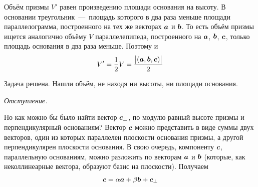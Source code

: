 \documentclass[a4paper,12pt]{article}
\begin{document}
  \begin{solution}
    Объём призмы $V'$ равен произведению площади основания на высоту.
    В основании треугольник~---~площадь которого в два раза меньше площади параллелограмма, построенного на тех же векторах $\boldsymbol a$ и $\boldsymbol b$.
    То есть объём призмы ищется аналогично объёму $V$ параллелепипеда, построенного на $\boldsymbol a$, $\boldsymbol b$, $\boldsymbol c$, только площадь основания в два раза меньше.
    Поэтому и
    \[
      V' = \frac{1}{2} V = \frac{\bigl|(\boldsymbol a, \boldsymbol b, \boldsymbol c)\bigr|}{2}
    \]
    
    Задача решена.
    Нашли объём, не находя ни высоты, ни площади основания.
    
    \bigskip
    
    \emph{Отступление.}
    
    Но как можно бы было найти вектор $\boldsymbol c_{\perp}$, по модулю равный высоте призмы и перпендикулярный основаниям?
    Вектор $\boldsymbol c$ можно представить в виде суммы двух векторов, один из которых параллелен плоскости основания призмы, а другой перпендикулярен плоскости основания.
    В свою очередь, компоненту $\boldsymbol c$, параллельную основаниям, можно разложить по векторам $\boldsymbol a$ и $\boldsymbol b$ (которые, как неколлинеарные вектора, образуют базис на плоскости).
    Получаем
    \[
      \boldsymbol c = \alpha \boldsymbol a + \beta \boldsymbol b + \boldsymbol c_{\perp}
    \]
    

\end{solution}
\end{document}
